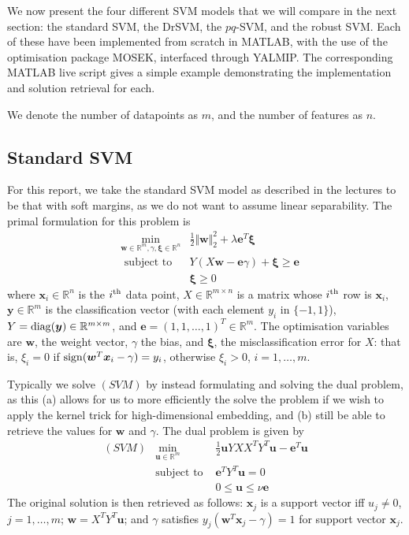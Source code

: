 \documentclass[11pt]{article}
\newcommand{\ds}{\displaystyle}
\begin{document}
We now present the four different SVM models that we will compare in the next section: the standard SVM, the DrSVM, the $pq$-SVM, and the robust SVM. Each of these have been implemented from scratch in MATLAB, with the use of the optimisation package MOSEK, interfaced through YALMIP. The corresponding MATLAB live script gives a simple example demonstrating the implementation and solution retrieval for each.

We denote the number of datapoints as $m$, and the number of features as $n$. 

\subsection{Standard SVM}

For this report, we take the standard SVM model as described in the lectures to be that with soft margins, as we do not want to assume linear separability. The primal formulation for this problem is
\begin{eqnarray*}
& \ds \min_{\pmb{w}\in\mathbb{R}^m,\gamma,\pmb{\xi}\in\mathbb{R}^n} & \frac{1}{2}\Vert \bm{w} \Vert_2^2  + \lambda\bm{e}^T\bm{\xi} 
\\
& \mbox{ subject to } & Y(X\bm{w} - \bm{e}\gamma) + \bm{\xi} \geq \bm{e} 
\\
& & \bm{\xi} \geq 0
\end{eqnarray*}
where $\bm{x}_i\in\mathbb{R}^n$ is the $i^{\rm th}$ data point, $X\in\mathbb{R}^{m\times n}$ is a matrix whose $i^{\rm th}$ row is $\bm{x}_i$, $\bm{y}\in\mathbb{R}^m$ is the classification vector (with each element $y_i$ in $\{-1, 1\}$), $Y = {\rm diag}(\bm{y})\in\mathbb{R}^{m\times m}$, and $\bm{e} = (1, 1, \dots, 1)^T\in\mathbb{R}^{m}$. The optimisation variables are $\bm{w}$, the weight vector, $\gamma$ the bias, and $\bm{\xi}$, the misclassification error for $X$: that is, $\xi_i = 0$ if ${\rm sign}(\bm{w}^T\bm{x}_i - \gamma) = y_i$, otherwise $\xi_i > 0$, $i=1,\dots,m$. 

Typically we solve $(SVM)$ by instead formulating and solving the dual problem, as this (a) allows for us to more efficiently the solve the problem if we wish to apply the kernel trick for high-dimensional embedding, and (b) still be able to retrieve the values for $\bm{w}$ and $\gamma$. The dual problem is given by
\begin{eqnarray*}
(SVM) & \ds\min_{\pmb{u}\in\mathbb{R}^m} & \frac{1}{2} \bm{u}YXX^TY^T\bm{u} - \bm{e}^T\bm{u}
\\
& \mbox{subject to } & \bm{e}^TY^T\bm{u} = 0
\\
& & 0 \leq \bm{u} \leq \nu\bm{e}
\end{eqnarray*}
The original solution is then retrieved as follows: $\bm{x}_j$ is a support vector iff $u_j\neq 0$, $j=1,\dots,m$; $\bm{w} = X^TY^T\bm{u}$; and $\gamma$ satisfies $y_j(\bm{w}^T\bm{x}_j - \gamma) = 1$ for support vector $\bm{x}_j$. 
\end{document}
